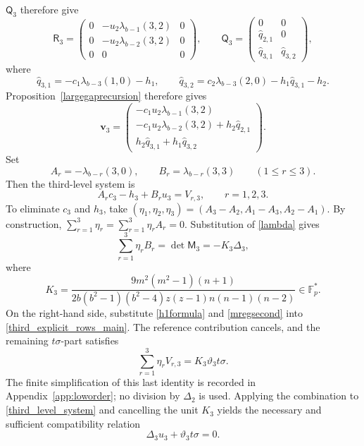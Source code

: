 \documentclass[12pt]{article}
\theoremstyle{remark}
\newcommand{\F}{\mathbb{F}_p}
\begin{document}
$\mathsf Q_3$ therefore give
\[
 \mathsf R_3=
 \begin{pmatrix}
  0&-u_2\lambda_{b-1}(3,2)&0\\
  0&-u_2\lambda_{b-2}(3,2)&0\\
  0&0&0
 \end{pmatrix},\qquad
 \mathsf Q_3=
 \begin{pmatrix}
  0&0\\
  \widehat q_{2,1}&0\\
  \widehat q_{3,1}&\widehat q_{3,2}
 \end{pmatrix},
\]
where
\[
 \widehat q_{3,1}=-c_1\lambda_{b-3}(1,0)-h_1,
 \qquad
 \widehat q_{3,2}=c_2\lambda_{b-3}(2,0)
                  -h_1\widehat q_{3,1}-h_2.
\]
Proposition~\ref{largegaprecursion} therefore gives
\begin{equation}\label{third_explicit_rows_main}
 \mathbf v_3=
 \begin{pmatrix}
 -c_1u_2\lambda_{b-1}(3,2)\\
 -c_1u_2\lambda_{b-2}(3,2)+h_2\widehat q_{2,1}\\
 h_2\widehat q_{3,1}+h_1\widehat q_{3,2}
 \end{pmatrix}.
\end{equation}
Set
\[
 A_r=-\lambda_{b-r}(3,0),\qquad
 B_r=\lambda_{b-r}(3,3)\qquad(1\le r\le3).
\]
Then the third-level system is
\begin{equation}\label{third_level_system}
 A_rc_3-h_3+B_ru_3=V_{r,3},\qquad r=1,2,3.
\end{equation}
To eliminate $c_3$ and $h_3$, take
$(\eta_1,\eta_2,\eta_3)=(A_3-A_2,A_1-A_3,A_2-A_1)$.  By construction, $\sum_{r=1}^3\eta_r=\sum_{r=1}^3\eta_rA_r=0$.  Substitution of
\eqref{lambda} gives
\[
 \sum_{r=1}^3\eta_rB_r=\det \mathsf M_3=-K_3\Delta_3,
\]
where
\[
 K_3=\frac{9m^2(m^2-1)(n+1)}
 {2b(b^2-1)(b^2-4)z(z-1)n(n-1)(n-2)}\in\F^*.
\]
On the right-hand side, substitute
\eqref{h1formula} and \eqref{mregsecond} into
\eqref{third_explicit_rows_main}.  The reference contribution cancels,
and the remaining $t\sigma$-part satisfies
\[
 \sum_{r=1}^3\eta_rV_{r,3}=K_3\vartheta_3t\sigma.
\]
The finite simplification of this last identity is recorded in
Appendix~\ref{app:loworder}; no division by $\Delta_2$ is used.
Applying the combination to \eqref{third_level_system} and cancelling
the unit $K_3$ yields the necessary and sufficient compatibility
relation
\begin{equation}\label{mregthird}
 \Delta_3u_3+\vartheta_3t\sigma=0.
\end{equation}
\end{document}
